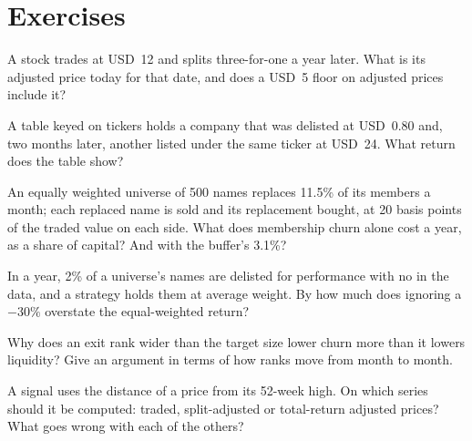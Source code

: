 \section{Exercises}

\begin{exercise}[$\star$]\label{exo:rs:universe-symbology-and-corporate-actions:1}
A stock trades at USD~12 and splits three-for-one a year later. What is its adjusted price today for that date, and does a USD~5
floor on adjusted prices include it?
\end{exercise}

\begin{exercise}[$\star$]\label{exo:rs:universe-symbology-and-corporate-actions:2}
A table keyed on tickers holds a company that was delisted at USD~0.80 and, two months later, another listed under the same ticker
at USD~24. What return does the table show?
\end{exercise}

\begin{exercise}[$\star$]\label{exo:rs:universe-symbology-and-corporate-actions:3}
An equally weighted universe of 500 names replaces 11.5\% of its members a month; each replaced name is sold and its replacement
bought, at 20 basis points of the traded value on each side. What does membership churn alone cost a year, as a share of capital?
And with the buffer's 3.1\%?
\end{exercise}

\begin{exercise}[$\star\star$]\label{exo:rs:universe-symbology-and-corporate-actions:4}
In a year, 2\% of a universe's names are delisted for performance with no  in the data, and a strategy holds them
at average weight. By how much does ignoring a $-30\%$  overstate the equal-weighted return?
\end{exercise}

\begin{exercise}[$\star\star$]\label{exo:rs:universe-symbology-and-corporate-actions:5}
Why does an exit rank wider than the target size lower churn more than it lowers liquidity? Give an argument in terms of how ranks
move from month to month.
\end{exercise}

\begin{exercise}[$\star\star$]\label{exo:rs:universe-symbology-and-corporate-actions:6}
A signal uses the distance of a price from its 52-week high. On which series should it be computed: traded, split-adjusted or
total-return adjusted prices? What goes wrong with each of the others?
\end{exercise}

